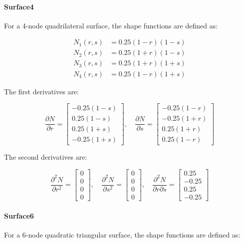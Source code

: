 \paragraph{Surface4} For a 4-node quadrilateral surface, the shape functions are defined as:

\[
\begin{aligned}
N_1(r, s) &= 0.25 (1 - r)(1 - s) \\
N_2(r, s) &= 0.25 (1 + r)(1 - s) \\
N_3(r, s) &= 0.25 (1 + r)(1 + s) \\
N_4(r, s) &= 0.25 (1 - r)(1 + s)
\end{aligned}
\]

The first derivatives are:

\[
\frac{\partial N}{\partial r} =
\begin{bmatrix}
-0.25 (1 - s) \\
0.25 (1 - s) \\
0.25 (1 + s) \\
-0.25 (1 + s)
\end{bmatrix}, \quad
\frac{\partial N}{\partial s} =
\begin{bmatrix}
-0.25 (1 - r) \\
-0.25 (1 + r) \\
0.25 (1 + r) \\
0.25 (1 - r)
\end{bmatrix}
\]

The second derivatives are:

\[
\frac{\partial^2 N}{\partial r^2} =
\begin{bmatrix}
0 \\
0 \\
0 \\
0
\end{bmatrix}, \quad
\frac{\partial^2 N}{\partial s^2} =
\begin{bmatrix}
0 \\
0 \\
0 \\
0
\end{bmatrix}, \quad
\frac{\partial^2 N}{\partial r \partial s} =
\begin{bmatrix}
0.25 \\
-0.25 \\
0.25 \\
-0.25
\end{bmatrix}
\]
\paragraph{Surface6} For a 6-node quadratic triangular surface, the shape functions are defined as:


